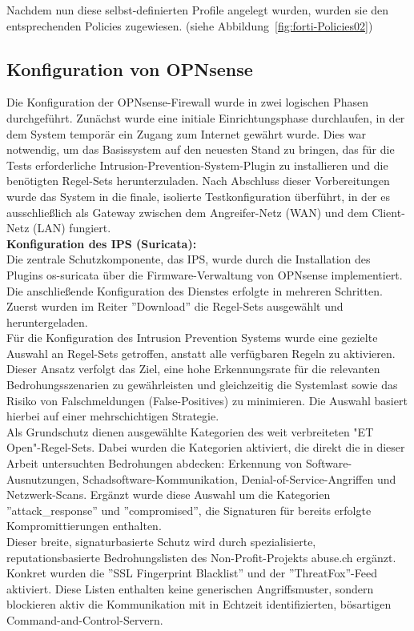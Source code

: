 Nachdem nun diese selbst-definierten Profile angelegt wurden, wurden sie den entsprechenden Policies zugewiesen. (siehe Abbildung~\ref{fig:forti-Policies02})


\subsection{Konfiguration von OPNsense}

Die Konfiguration der OPNsense-Firewall wurde in zwei logischen Phasen durchgeführt. Zunächst wurde eine initiale Einrichtungsphase durchlaufen, in der dem System temporär ein Zugang zum Internet gewährt wurde. Dies war notwendig, um das Basissystem auf den neuesten Stand zu bringen, das für die Tests erforderliche Intrusion-Prevention-System-Plugin zu installieren und die benötigten Regel-Sets herunterzuladen. Nach Abschluss dieser Vorbereitungen wurde das System in die finale, isolierte Testkonfiguration überführt, in der es ausschließlich als Gateway zwischen dem Angreifer-Netz (WAN) und dem Client-Netz (LAN) fungiert.\\

\textbf{Konfiguration des IPS (Suricata):}\\
Die zentrale Schutzkomponente, das IPS, wurde durch die Installation des Plugins os-suricata über die Firmware-Verwaltung von OPNsense implementiert. Die anschließende Konfiguration des Dienstes erfolgte in mehreren Schritten. Zuerst wurden im Reiter ''Download'' die Regel-Sets ausgewählt und heruntergeladen.\\

Für die Konfiguration des Intrusion Prevention Systems wurde eine gezielte Auswahl an Regel-Sets getroffen, anstatt alle verfügbaren Regeln zu aktivieren. Dieser Ansatz verfolgt das Ziel, eine hohe Erkennungsrate für die relevanten Bedrohungsszenarien zu gewährleisten und gleichzeitig die Systemlast sowie das Risiko von Falschmeldungen (False-Positives) zu minimieren. Die Auswahl basiert hierbei auf einer mehrschichtigen Strategie.\\
Als Grundschutz dienen ausgewählte Kategorien des weit verbreiteten "ET Open"-Regel-Sets. Dabei wurden die Kategorien aktiviert, die direkt die in dieser Arbeit untersuchten Bedrohungen abdecken: Erkennung von Software-Ausnutzungen, Schadsoftware-Kommunikation, Denial-of-Service-Angriffen und Netzwerk-Scans. Ergänzt wurde diese Auswahl um die Kategorien ''attack\_response'' und ''compromised'', die Signaturen für bereits erfolgte Kompromittierungen enthalten.\\
Dieser breite, signaturbasierte Schutz wird durch spezialisierte, reputationsbasierte Bedrohungslisten des Non-Profit-Projekts abuse.ch ergänzt. Konkret wurden die ''SSL Fingerprint Blacklist'' und der ''ThreatFox''-Feed aktiviert. Diese Listen enthalten keine generischen Angriffsmuster, sondern blockieren aktiv die Kommunikation mit in Echtzeit identifizierten, bösartigen Command-and-Control-Servern.

